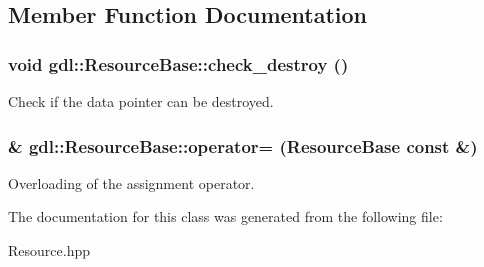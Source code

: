 \subsection{Member Function Documentation}
\hypertarget{classgdl_1_1ResourceBase_add4498c5016ed85778964adc7b932412}{
\subsubsection[{check\_\-destroy}]{\setlength{\rightskip}{0pt plus 5cm}void gdl::ResourceBase::check\_\-destroy ()}}
\label{classgdl_1_1ResourceBase_add4498c5016ed85778964adc7b932412}
Check if the data pointer can be destroyed. \hypertarget{classgdl_1_1ResourceBase_a6655b5024b90d376ba4ed4f807d03f90}{
\subsubsection[{operator=}]{\& gdl::ResourceBase::operator= ({\bf ResourceBase} const \&)}}
\label{classgdl_1_1ResourceBase_a6655b5024b90d376ba4ed4f807d03f90}
Overloading of the assignment operator. 

The documentation for this class was generated from the following file:\begin{DoxyCompactItemize}
\item 
Resource.hpp\end{DoxyCompactItemize}
